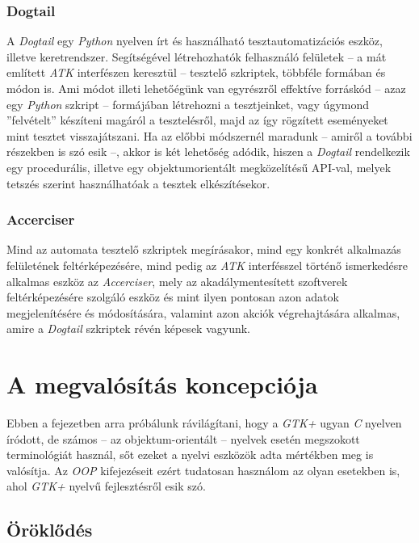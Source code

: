 \subsubsection{Dogtail}

A \textit{Dogtail} egy \textit{Python} nyelven írt és használható tesztautomatizációs eszköz, illetve keretrendszer. Segítségével létrehozhatók felhasználó felületek -- a mát említett \textit{ATK} interfészen keresztül -- tesztelő szkriptek, többféle formában és módon is. Ami módot illeti lehetőégünk van egyrészről effektíve forráskód -- azaz egy \textit{Python} szkript -- formájában létrehozni a tesztjeinket, vagy úgymond ''felvételt'' készíteni magáról a tesztelésről, majd az így rögzített eseményeket mint tesztet visszajátszani. Ha az előbbi módszernél maradunk -- amiről a további részekben is szó esik --, akkor is két lehetőség adódik, hiszen a \textit{Dogtail} rendelkezik egy procedurális, illetve egy objektumorientált megközelítésű API-val, melyek tetszés szerint használhatóak a tesztek elkészítésekor.

\subsubsection{Accerciser}

Mind az automata tesztelő szkriptek megírásakor, mind egy konkrét alkalmazás felületének feltérképezésére, mind pedig az \textit{ATK} interfésszel történő ismerkedésre alkalmas eszköz az \textit{Accerciser}, mely az akadálymentesített szoftverek feltérképezésére szolgáló eszköz és mint ilyen pontosan azon adatok megjelenítésére és módosítására, valamint azon akciók végrehajtására alkalmas, amire a \textit{Dogtail} szkriptek révén képesek vagyunk.

\section{A megvalósítás koncepciója}

Ebben a fejezetben arra próbálunk rávilágítani, hogy a \textit{GTK+} ugyan \textit{C} nyelven íródott, de számos -- az objektum-orientált -- nyelvek esetén megszokott terminológiát használ, sőt ezeket a nyelvi eszközök adta mértékben meg is valósítja. Az \textit{OOP} kifejezéseit ezért tudatosan használom az olyan esetekben is, ahol \textit{GTK+} nyelvű fejlesztésről esik szó.

\subsection{Öröklődés}

